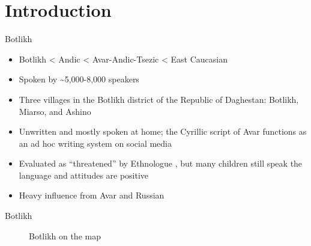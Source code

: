  



\begin{frame}
\titlepage
\end{frame}

\section{Introduction}
\begin{frame}{Botlikh}
    \begin{itemize}
        \item Botlikh < Andic < Avar-Andic-Tsezic < East Caucasian
        \item Spoken by \textasciitilde{}5,000-8,000 speakers
        \item Three villages in the Botlikh district of the Republic of Daghestan: Botlikh, Miarso, and Ashino
        \item Unwritten and mostly spoken at home; the Cyrillic script of Avar functions as an ad hoc writing system on social media
        \item Evaluated as ``threatened'' by Ethnologue \citet{simonsfenning2018}, but many children still speak the language and attitudes are positive
        \item Heavy influence from Avar and Russian 
    \end{itemize}
\end{frame}

\begin{frame}{Botlikh}
\begin{figure}[h]
\centering
{}
\caption{Botlikh on the map}
\end{figure}
\end{frame}

